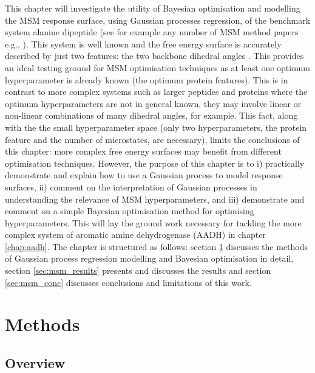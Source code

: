 This chapter will investigate the utility of Bayesian optimisation and modelling the MSM response surface, using Gaussian processes regression, of the benchmark system alanine dipeptide (see for example any number of MSM method papers e.g.,  \cite{wehmeyerTimelaggedAutoencodersDeep2018a,nuskeVariationalApproachMolecular2014,bowmanQuantitativeComparisonAlternative2013}). This system is well known and the free energy surface is accurately described by just two features: the two backbone dihedral angles \cite{bolhuis2000reaction}. This provides an ideal testing ground for MSM optimisation techniques as at least one optimum hyperparameter is already known (the optimum protein features).  This is in contrast to more complex systems such as larger peptides and proteins where the optimum hyperparameters are not in general known,  they may involve linear or non-linear combinations of many dihedral angles, for example.  This fact, along with the the small hyperparameter space (only two hyperparameters, the protein feature and the number of microstates, are necessary), limits the conclusions of this chapter:  more complex free energy surfaces may benefit from different optimisation techniques.  However, the purpose of this chapter is to i) practically demonstrate and explain how to use a Gaussian process to model response surfaces, ii) comment on the interpretation of Gaussian processes in understanding the relevance of MSM hyperparameters, and iii) demonstrate and comment on a simple Bayesian optimisation method for optimising hyperparameters. This will lay the ground work necessary for tackling the more complex  system of aromatic amine dehydrogenase (AADH) in chapter \ref{chap:aadh}. The chapter is structured as follows: section \ref{sec:msm_methods} discusses the methods of Gaussian process regression modelling and Bayesian optimisation in detail, section \ref{sec:msm_results} presents and discusses the results and section \ref{sec:msm_conc} discusses conclusions and limitations of this work. 

\section{Methods}\label{sec:msm_methods}

\subsection{Overview}

